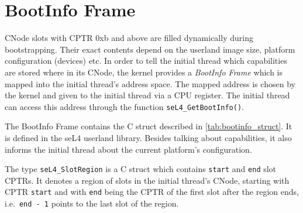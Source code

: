 \section{\label{ch:bootup:bootinfo}BootInfo Frame}

CNode slots with CPTR 0xb and above are filled dynamically during
bootstrapping. Their exact contents depend on the userland image size,
platform configuration (devices) etc. In order to tell the initial thread
which capabilities are stored where in its CNode, the kernel provides
a \emph{BootInfo Frame} which is mapped into the initial thread's address
space. The mapped address is chosen by the kernel and given to the initial
thread via a CPU register. The initial thread can access this address
through the function \texttt{seL4\_GetBootInfo()}.

The BootInfo Frame contains the C struct described in
\autoref{tab:bootinfo_struct}.
It is defined in the seL4 userland library. Besides talking about
capabilities, it also informs the initial thread about
the current platform's configuration.

The type \texttt{seL4\_SlotRegion} is a C struct
which contains \texttt{start} and \texttt{end} slot CPTRs. It denotes a region
of slots in the initial thread's CNode, starting with CPTR \texttt{start} and with
\texttt{end} being the CPTR of the first slot after the region ends, i.e.\
\texttt{end - 1} points to the last slot of the region.

